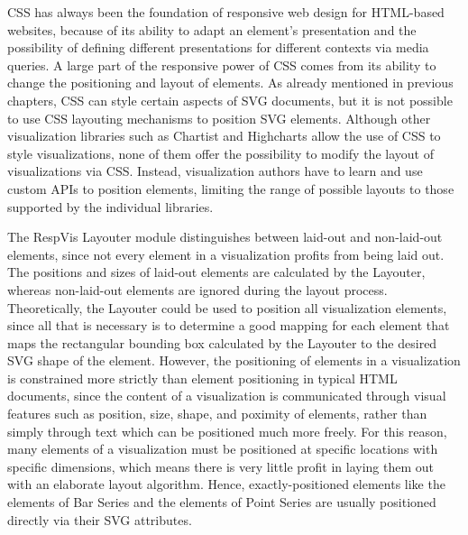 CSS has always been the foundation of responsive web design for
HTML-based websites, because of its ability to adapt an element's
presentation and the possibility of defining different presentations
for different contexts via media queries. A large part of the
responsive power of CSS comes from its ability to change the
positioning and layout of elements. As already mentioned in previous
chapters, CSS can style certain aspects of SVG documents, but it is
not possible to use CSS layouting mechanisms to position SVG elements.
Although other visualization libraries such as Chartist
\parencite{Chartist} and Highcharts \parencite{Highcharts} allow the
use of CSS to style visualizations, none of them offer the possibility
to modify the layout of visualizations via CSS. Instead, visualization
authors have to learn and use custom APIs to position elements,
limiting the range of possible layouts to those supported by the
individual libraries.

The RespVis Layouter module distinguishes between laid-out and
non-laid-out elements, since not every element in a visualization
profits from being laid out. The positions and sizes of laid-out
elements are calculated by the Layouter, whereas non-laid-out elements
are ignored during the layout process.  Theoretically, the Layouter
could be used to position all visualization elements, since all that
is necessary is to determine a good mapping for each element that maps
the rectangular bounding box calculated by the Layouter to the desired
SVG shape of the element. However, the positioning of elements in a
visualization is constrained more strictly than element positioning in
typical HTML documents, since the content of a visualization is
communicated through visual features such as position, size, shape,
and poximity of elements, rather than simply through text which can be
positioned much more freely. For this reason, many elements of a
visualization must be positioned at specific locations with specific
dimensions, which means there is very little profit in laying them out
with an elaborate layout algorithm. Hence, exactly-positioned elements
like the  elements of Bar Series and the
 elements of Point Series are usually positioned
directly via their SVG attributes.


